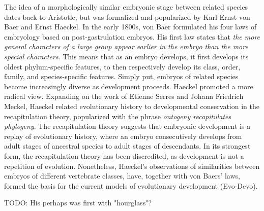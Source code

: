 The idea of a morphologically similar embryonic stage between related species dates back to Aristotle\cite{Aristotle1943}, but was formalized and popularized by Karl Ernst von Baer and Ernst Haeckel\cite{haeckel1866,baer1828}. In the early 1800s, von Baer formulated his four laws of embryology based on post-gastrulation embryos. His first law states that \textit{the more general characters of a large group appear earlier in the embryo than the more special characters}. This means that as an embryo develops, it first develops its oldest phylum-specific features, to then respectively develop its class, order, family, and species-specific features. Simply put, embryos of related species become increasingly diverse as development proceeds. Haeckel promoted a more radical view. Expanding on the work of Etienne Serres and Johann Friedrich Meckel, Haeckel related evolutionary history to developmental conservation in the recapitulation theory, popularized with the phrase \textit{ontogeny recapitulates phylogeny}. The recapitulation theory suggests that embryonic development is a replay of evolutionary history, where an embryo consecutively develops from adult stages of ancestral species to adult stages of descendants. In its strongest form, the recapitulation theory has been discredited, as development is not a repetition of evolution\cite{ehrlich1974}. Nonetheless, Haeckel's observations of similarities between embryos of different vertebrate classes, have, together with von Baers’ laws, formed the basis for the current models of evolutionary development (Evo-Devo).

TODO: His perhaps was first with "hourglass"? 

